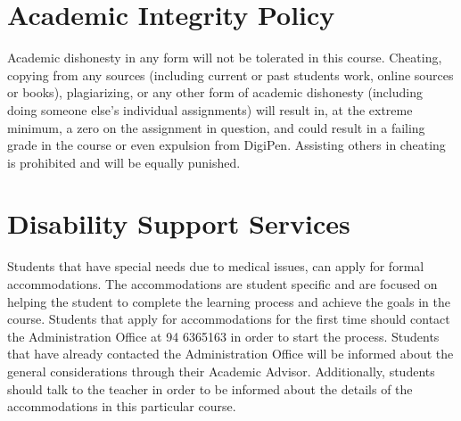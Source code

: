 \documentclass[12pt]{article}
\begin{document}
\vspace{5 mm}

\section*{Academic Integrity Policy}

Academic dishonesty in any form will not be tolerated in this course. Cheating, copying from any sources (including current or past students work, online sources 
or books), plagiarizing, or any other form of academic dishonesty (including doing someone else’s individual assignments) will result in, at the extreme minimum,
 a zero on the assignment in question, and could result in a failing grade in the course or even expulsion from DigiPen. Assisting others in cheating is prohibited 
 and will be equally punished.

\section*{Disability Support Services}

Students that have special needs due to medical issues, can apply for formal accommodations. 
The accommodations are student specific and are focused on helping the student to complete the 
learning process and achieve the goals in the course. Students that apply for accommodations for the first
 time should contact the Administration Office at 94 6365163 in order to start the process. Students that 
 have already contacted the Administration Office will be informed about the general considerations through
  their Academic Advisor. Additionally, students should talk to the teacher in order to be informed about the
   details of the accommodations in this particular course. 







\end{document}
